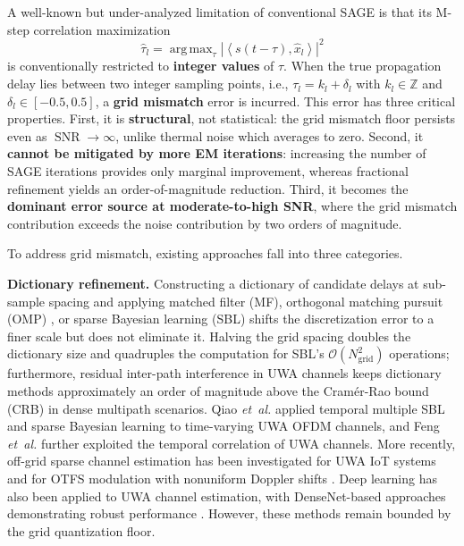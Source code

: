 \documentclass[a4paper,fleqn]{cas-dc}
\DeclareMathOperator*{\argmax}{arg\,max}
\DeclareMathOperator{\SNR}{SNR}
\newcommand{\Zz}{\mathbb{Z}}
\newcommand{\bigO}{\mathcal{O}}
\newcommand{\abs}[1]{\left| #1 \right|}
\newcommand{\inner}[2]{\left\langle #1, #2 \right\rangle}
\newcommand{\hb}[1]{\hat{#1}}
\begin{document}
A well-known but under-analyzed limitation of conventional SAGE is that its M-step correlation maximization
\begin{equation}
\hb{\tau}_l = \argmax_{\tau} \abs{\inner{s(t-\tau)}{\hb{x}_l}}^2
\label{eq:mstep}
\end{equation}
is conventionally restricted to \textbf{integer values} of $\tau$. When the true propagation delay lies between two integer sampling points, i.e., $\tau_l = k_l + \delta_l$ with $k_l \in \Zz$ and $\delta_l \in [-0.5, 0.5]$, a \textbf{grid mismatch} error is incurred. This error has three critical properties. First, it is \textbf{structural}, not statistical: the grid mismatch floor persists even as $\SNR \to \infty$, unlike thermal noise which averages to zero. Second, it \textbf{cannot be mitigated by more EM iterations}: increasing the number of SAGE iterations provides only marginal improvement, whereas fractional refinement yields an order-of-magnitude reduction. Third, it becomes the \textbf{dominant error source at moderate-to-high SNR}, where the grid mismatch contribution exceeds the noise contribution by two orders of magnitude.

To address grid mismatch, existing approaches fall into three categories.

\textbf{Dictionary refinement.} Constructing a dictionary of candidate delays at sub-sample spacing and applying matched filter (MF), orthogonal matching pursuit (OMP) \cite{pati1993}, or sparse Bayesian learning (SBL) \cite{wipf2004} shifts the discretization error to a finer scale but does not eliminate it. Halving the grid spacing doubles the dictionary size and quadruples the computation for SBL's $\bigO(N_{\text{grid}}^2)$ operations; furthermore, residual inter-path interference in UWA channels keeps dictionary methods approximately an order of magnitude above the Cram\'{e}r-Rao bound (CRB) in dense multipath scenarios. Qiao \textit{et~al.} \cite{qiao2020,qiaoSparseBayesianLearning2018} applied temporal multiple SBL and sparse Bayesian learning to time-varying UWA OFDM channels, and Feng \textit{et~al.} \cite{WOS:000930761300001} further exploited the temporal correlation of UWA channels. More recently, off-grid sparse channel estimation has been investigated for UWA IoT systems \cite{11348964} and for OTFS modulation with nonuniform Doppler shifts \cite{yangUnderwaterAcousticOTFS2026}. Deep learning has also been applied to UWA channel estimation, with DenseNet-based approaches demonstrating robust performance \cite{liuDenseNetBasedRobustChannel2025}. However, these methods remain bounded by the grid quantization floor.
\end{document}
